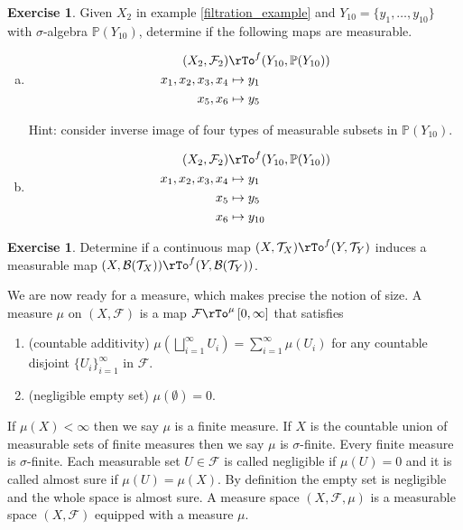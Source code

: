 \documentclass[12pt]{amsart}
\theoremstyle{definition}
\newtheorem{exercise}[theorem]{Exercise}
\begin{document}
\begin{exercise} Given $X_2$ in example \ref{filtration_example} and $Y_{10} = \{y_1, \dots ,y_{10}\}$ with $\sigma$-algebra $\mathbb{P}(Y_{10})$, determine if the following maps are measurable.
\begin{enumerate}[a.]
\item
\begin{align*}
(X_2, \mathcal{F}_2) & \rTo^f (Y_{10}, \mathbb{P}(Y_{10})) \\
x_1, x_2, x_3, x_4 & \mapsto y_1 \\
x_5, x_6 & \mapsto y_5
\end{align*}

Hint: consider inverse image of four types of measurable subsets in $\mathbb{P}(Y_{10})$.
\item
\begin{align*}
(X_2, \mathcal{F}_2) & \rTo^f (Y_{10}, \mathbb{P}(Y_{10})) \\
x_1, x_2, x_3, x_4 & \mapsto y_1 \\
x_5 & \mapsto y_5 \\
x_6 & \mapsto y_{10}
\end{align*}
\end{enumerate}
\end{exercise}

\begin{exercise} Determine if a continuous map $(X, \mathcal{T}_X) \rTo^f (Y, \mathcal{T}_Y)$ induces a measurable map $(X, \mathcal{B}(\mathcal{T}_X)) \rTo^f (Y, \mathcal{B}(\mathcal{T}_Y))$.
\end{exercise}


We are now ready for a measure, which makes precise the notion of size.
\dfn A measure $\mu$ on $(X, \mathcal{F})$ is a map $\mathcal{F} \rTo^{\mu} \, [0, \infty]$ that satisfies
\begin{enumerate}[1.]
\item (countable additivity) $\mu \left( \bigsqcup\limits_{i=1}^{\infty} U_i \right) = \sum\limits_{i=1}^{\infty} \mu(U_i)$ for any countable disjoint $\{U_i\}_{i=1}^{\infty}$ in $\mathcal{F}$.
\item (negligible empty set) $\mu(\emptyset) = 0$.
\end{enumerate}

If $\mu(X) < \infty$ then we say $\mu$ is a finite measure. If $X$ is the countable union of measurable sets of finite measures then we say $\mu$ is $\sigma$-finite. Every finite measure is $\sigma$-finite. Each measurable set $U \in \mathcal{F}$ is called negligible if $\mu(U) = 0$ and it is called almost sure if $\mu(U) = \mu(X)$. By definition the empty set is negligible and the whole space is almost sure.
\dfn A measure space $(X, \mathcal{F}, \mu)$ is a measurable space $(X, \mathcal{F})$ equipped with a measure $\mu$.
\end{document}
